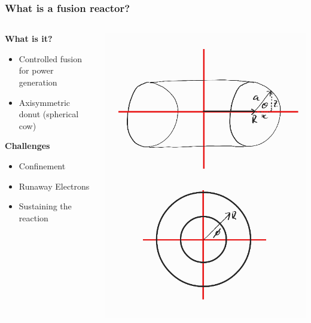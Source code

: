 \documentclass{beamer}
\begin{document}
\begin{frame}
\frametitle{What is a fusion reactor?}

\begin{columns}[T]

    \begin{column}{.5\textwidth}
        \textbf{What is it?}
        \begin{itemize}
            \item Controlled fusion for power generation
            \item Axisymmetric donut (spherical cow)
        \end{itemize}

        \textbf{Challenges}
        \begin{itemize}
            \item Confinement
            \item Runaway Electrons
            \item Sustaining the reaction
        \end{itemize}
    \end{column}

    \begin{column}{.5\textwidth}
        \includegraphics[scale=0.28]{imgs/dimensions.png}
    \end{column}

\end{columns}

\end{frame}
\end{document}
